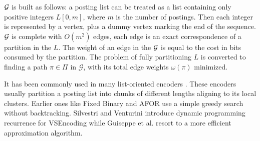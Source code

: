 \documentclass{sig-alternate-05-2015}
\begin{document}
$ \cal G $ is built as follows: a posting list can be treated as a list containing only positive integers $ L[0,m] $, where $ m $ is the number of postings.
Then each integer is represented by a vertex, plus a dummy vertex marking the end of the sequence.
$ \cal G $ is complete with $ O(m^2) $ edges, each edge is an exact correspondence of a partition in the $ L $.
The weight of an edge in the $ \cal G $ is equal to the cost in bits consumed by the partition.
The problem of fully partitioning $ L $ is converted to finding a path $\pi \in \Pi $ in $\mathcal{G}$, with its total edge weights $ \omega(\pi) $ minimized.

It has been commonly used in many list-oriented encoders \cite{song2016optimizing}.
These encoders usually partition a posting list into chunks of different lengths aligning to its local clusters.
Earlier ones like Fixed Binary \cite{anh2004index} and AFOR use a simple greedy search without backtracking.
Silvestri and Venturini introduce dynamic programming recurrence for VSEncoding \cite{silvestri2010vsencoding} while Guiseppe et al. resort to a more efficient approximation algorithm.
\end{document}
